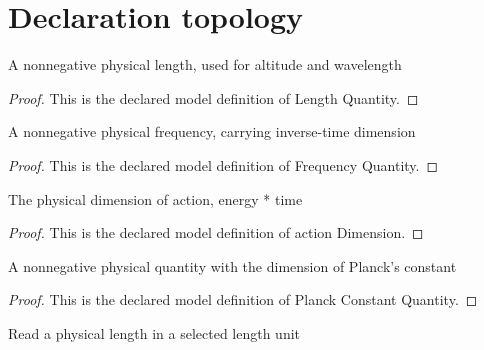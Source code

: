 \section{Declaration topology}
\begin{definition}
  \label{def:physics:phyx-mini-0579:phyxminiproblems-problemphyxmini0579-lengthquantity}
  A nonnegative physical length, used for altitude and wavelength
\end{definition}
\begin{proof}
  This is the declared model definition of Length Quantity.
\end{proof}
\begin{definition}
  \label{def:physics:phyx-mini-0579:phyxminiproblems-problemphyxmini0579-frequencyquantity}
  A nonnegative physical frequency, carrying inverse-time dimension
\end{definition}
\begin{proof}
  This is the declared model definition of Frequency Quantity.
\end{proof}
\begin{definition}
  \label{def:physics:phyx-mini-0579:phyxminiproblems-problemphyxmini0579-actiondimension}
  The physical dimension of action, energy * time
\end{definition}
\begin{proof}
  This is the declared model definition of action Dimension.
\end{proof}
\begin{definition}
  \label{def:physics:phyx-mini-0579:phyxminiproblems-problemphyxmini0579-planckconstantquantity}
  A nonnegative physical quantity with the dimension of Planck's constant
\end{definition}
\begin{proof}
  This is the declared model definition of Planck Constant Quantity.
\end{proof}
\begin{definition}
  \label{def:physics:phyx-mini-0579:phyxminiproblems-problemphyxmini0579-lengthreadout}
  Read a physical length in a selected length unit
\end{definition}
